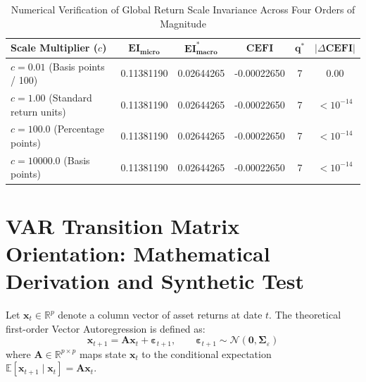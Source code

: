 \documentclass[12pt]{article}
\begin{document}
\begin{table}[htbp]
\centering
\caption{Numerical Verification of Global Return Scale Invariance Across Four Orders of Magnitude}
\label{tab:app_scale_inv}
\begin{tabular}{lccccc}
\toprule
\textbf{Scale Multiplier ($c$)} & $\mathbf{EI_{\text{micro}}}$ & $\mathbf{EI_{\text{macro}}^*}$ & $\mathbf{CEFI}$ & $\mathbf{q^*}$ & $|\Delta \mathbf{CEFI}|$ \\
\midrule
$c = 0.01$ (Basis points / 100) & 0.11381190 & 0.02644265 & -0.00022650 & 7 & $0.00$ \\
$c = 1.00$ (Standard return units) & 0.11381190 & 0.02644265 & -0.00022650 & 7 & $< 10^{-14}$ \\
$c = 100.0$ (Percentage points)   & 0.11381190 & 0.02644265 & -0.00022650 & 7 & $< 10^{-14}$ \\
$c = 10000.0$ (Basis points)      & 0.11381190 & 0.02644265 & -0.00022650 & 7 & $< 10^{-14}$ \\
\bottomrule
\end{tabular}
\end{table}

\section{VAR Transition Matrix Orientation: Mathematical Derivation and Synthetic Test}
\label{app:var_orientation}

Let $\mathbf{x}_t \in \mathbb{R}^p$ denote a column vector of asset returns at date $t$. The theoretical first-order Vector Autoregression is defined as:
\begin{equation}
\mathbf{x}_{t+1} = \mathbf{A}\mathbf{x}_t + \boldsymbol{\varepsilon}_{t+1}, \qquad \boldsymbol{\varepsilon}_{t+1} \sim \mathcal{N}(\mathbf{0}, \boldsymbol{\Sigma}_\varepsilon)
\end{equation}
where $\mathbf{A} \in \mathbb{R}^{p \times p}$ maps state $\mathbf{x}_t$ to the conditional expectation $\mathbb{E}[\mathbf{x}_{t+1} \mid \mathbf{x}_t] = \mathbf{A}\mathbf{x}_t$.
\end{document}
